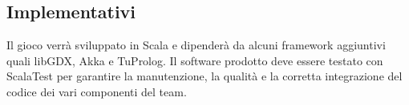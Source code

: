 \subsection{Implementativi}
Il gioco verrà sviluppato in Scala e dipenderà da alcuni framework aggiuntivi quali libGDX, Akka e TuProlog.
Il software prodotto deve essere testato con ScalaTest per garantire la manutenzione, la qualità e la corretta integrazione del codice dei vari componenti del team.